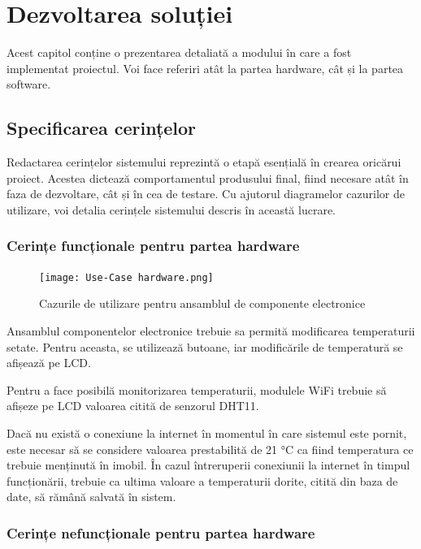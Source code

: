 \chapter{Dezvoltarea soluției}\label{ch:4dezvoltareaSolutiei}

	Acest capitol conține o prezentarea detaliată a modului în care a fost implementat proiectul. Voi face referiri atât la partea hardware, cât și la partea software. 

\section{Specificarea cerințelor}
	
	Redactarea cerințelor sistemului reprezintă o etapă esențială în crearea oricărui proiect. Acestea dictează comportamentul produsului final, fiind necesare atât în faza de dezvoltare, cât și în cea de testare. Cu ajutorul diagramelor cazurilor de utilizare, voi detalia cerințele sistemului descris în această lucrare.

\subsection{Cerințe funcționale pentru partea hardware}

\begin{figure}[H]
   	\centering
    	\texttt{[image: Use-Case hardware.png]}
	\caption{Cazurile de utilizare pentru ansamblul de componente electronice}
\end{figure}	

	Ansamblul componentelor electronice trebuie sa permită modificarea temperaturii setate. Pentru aceasta, se utilizează butoane, iar modificările de temperatură se afișează pe LCD.

 	Pentru a face posibilă monitorizarea temperaturii, modulele WiFi trebuie să afișeze pe LCD valoarea citită de senzorul DHT11. 

	Dacă nu există o conexiune la internet în momentul în care sistemul este pornit, este necesar să se considere valoarea prestabilită de 21 °C ca fiind temperatura ce trebuie menținută în imobil. În cazul întreruperii conexiunii la internet în timpul funcționării, trebuie ca ultima valoare a temperaturii dorite, citită din baza de date, să rămână salvată în sistem.  

\subsection{Cerințe nefuncționale pentru partea hardware}
	
